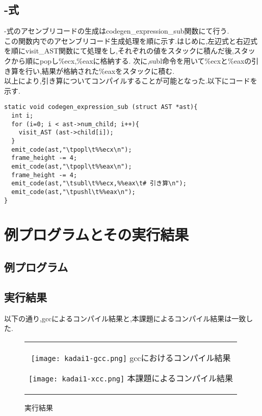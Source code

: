 \documentclass[10pt]{jsarticle}
\begin{document}
\subsection{-式}
-式のアセンブリコードの生成はcodegen\_expression\_sub関数にて行う.\\
この関数内でのアセンブリコード生成処理を順に示す.はじめに,左辺式と右辺式を順にvisit\_AST関数にて処理をし,それぞれの値をスタックに積んだ後,スタックから順にpopし\%ecx,\%eaxに格納する.
次に,subl命令を用いて\%ecxと\%eaxの引き算を行い,結果が格納された\%eaxをスタックに積む.\\
以上により,引き算についてコンパイルすることが可能となった.以下にコードを示す.
\begin{lstlisting}[caption=codegen\_expression\_sub関数]
static void codegen_expression_sub (struct AST *ast){
  int i;
  for (i=0; i < ast->num_child; i++){
    visit_AST (ast->child[i]);
  }
  emit_code(ast,"\tpopl\t%%ecx\n");
  frame_height -= 4;
  emit_code(ast,"\tpopl\t%%eax\n");
  frame_height -= 4;
  emit_code(ast,"\tsubl\t%%ecx,%%eax\t# 引き算\n");
  emit_code(ast,"\tpushl\t%%eax\n");
}
\end{lstlisting}


\section{例プログラムとその実行結果}
\subsection{例プログラム}

\subsection{実行結果}
以下の通り,gccによるコンパイル結果と,本課題によるコンパイル結果は一致した.
\begin{figure}[H]
  \begin{center}
    \begin{tabular}{c}

      \begin{minipage}{0.5\hsize}
        \begin{center}
          \texttt{[image: kadai1-gcc.png]}
          \hspace{3.0cm} gccにおけるコンパイル結果
        \end{center}
      \end{minipage}

      \begin{minipage}{0.5\hsize}
        \begin{center}
          \texttt{[image: kadai1-xcc.png]}
          \hspace{3.0cm} 本課題によるコンパイル結果
        \end{center}
      \end{minipage}

    \end{tabular}
    \caption{実行結果}
  \end{center}
\end{figure}
\end{document}
